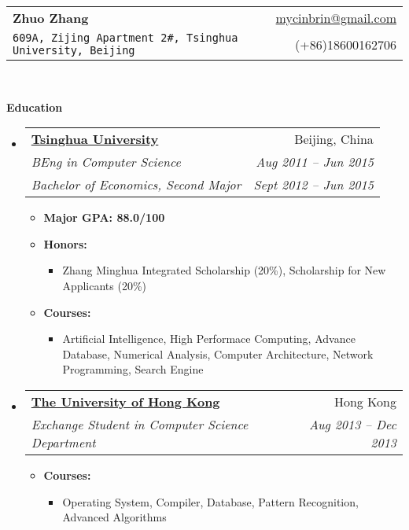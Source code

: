 \documentclass[letterpaper,11pt]{article}
\makeatletter
\newcommand{\resitem}[1]{\item #1 \vspace{-2pt}}
\newcommand{\resheading}[1]{{\large \colorbox{mygrey}{\begin{minipage}{\textwidth}{\textbf{#1 \vphantom{p\^{E}}}}\end{minipage}}}}
\newcommand{\ressubheading}[4]{
\begin{tabular*}{6.5in}{l@{\extracolsep{\fill}}r}
        \textbf{#1} & #2 \\
        \textit{#3} & \textit{#4} \\
\end{tabular*}\vspace{-6pt}}
\newcommand{\ressubheadingg}[6]{
\begin{tabular*}{6.5in}{l@{\extracolsep{\fill}}r}
        \textbf{#1} & #2 \\
        \textit{#3} & \textit{#4} \\
        \textit{#5} & \textit{#6} \\
\end{tabular*}\vspace{-6pt}}
\makeatother
\begin{document}
\newcommand{\mywebheader}{
\begin{tabular*}{7in}{l@{\extracolsep{\fill}}r}
    \textbf{{\LARGE Zhuo Zhang}} & \href{mailto:mycinbrin@gmail.com}{mycinbrin@gmail.com}\\
    {\footnotesize \texttt{609A, Zijing Apartment 2\#, Tsinghua University, Beijing}} & {(+86)18600162706}
    \end{tabular*}
\\
\vspace{0.1in}}

\mywebheader

\resheading{Education}
    \begin{itemize}
            \item
                \ressubheadingg{\href{http://www.tsinghua.edu.cn}{Tsinghua University}}{Beijing, China}{{BEng in Computer Science}}{Aug 2011 -- Jun 2015}{Bachelor of Economics, Second Major}{Sept 2012 -- Jun 2015}
                { \footnotesize
                \begin{itemize}
                        \resitem{\textbf{Major GPA: 88.0/100}}
                        \resitem{\textbf{Honors:}} 
                        \begin{itemize}
                                \resitem{Zhang Minghua Integrated Scholarship (20\%), Scholarship for New Applicants (20\%) }
                        \end{itemize}
						\resitem{\textbf{Courses:}}
						\begin{itemize}
								\resitem{Artificial Intelligence, High Performace Computing, Advance Database, Numerical Analysis, Computer Architecture, Network Programming, Search Engine}
						\end{itemize}
                \end{itemize}
                }
            \item
                \ressubheading{\href{http://www.hku.hku}{The University of Hong Kong}}{Hong Kong}{Exchange Student in Computer Science Department}{Aug 2013 -- Dec 2013}{}
                { \footnotesize
                \begin{itemize}
                      \resitem{\textbf{Courses:}}
                      \begin{itemize}
							  \resitem{Operating System, Compiler, Database, Pattern Recognition, Advanced Algorithms}
					  \end{itemize}
				\end{itemize}
			    }
    \end{itemize} %
\end{document}
